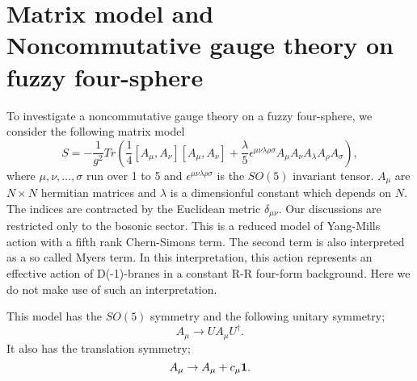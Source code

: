 \documentclass[a4paper,11pt]{article}
\begin{document}



\section{Matrix model and Noncommutative gauge theory on fuzzy four-sphere}
\label{section:NCGT}
\hspace{0.4cm}
To investigate a noncommutative gauge theory on a fuzzy four-sphere, 
we consider the following matrix model 
\begin{equation}
S=-\frac{1}{g^{2}}Tr\left(
\frac{1}{4}[A_{\mu},A_{\nu}][A_{\mu},A_{\nu}]
+\frac{\lambda}{5}\epsilon^{\mu\nu\lambda\rho\sigma}
A_{\mu}A_{\nu}A_{\lambda}A_{\rho}A_{\sigma}
\right),
\label{action}
\end{equation} 
where $\mu,\nu,\ldots,\sigma$ run over 1 to 5 and 
$\epsilon^{\mu\nu\lambda\rho\sigma}$ is the $SO(5)$ invariant tensor. 
$A_{\mu}$ are $N\times N$ hermitian matrices and 
$\lambda$ is a dimensionful constant which 
depends on $N$. 
The indices are contracted by the Euclidean metric $\delta_{\mu\nu}$. 
Our discussions are restricted only to the bosonic sector. 
This is a reduced model of Yang-Mills action with 
a fifth rank Chern-Simons term. 
The second term is also interpreted as a so called 
Myers term\cite{myers}. 
In this interpretation, this action represents 
an effective action of D(-1)-branes in a constant 
R-R four-form background. 
Here we do not make use of such an interpretation. 

This model has the $SO(5)$ symmetry and 
the following unitary symmetry; 
\begin{equation}
A_{\mu} \rightarrow UA_{\mu}U^{\dagger}. 
\label{unitarytr} 
\end{equation} 
It also has the translation symmetry; 
\begin{equation}
A_{\mu} \rightarrow A_{\mu} + c_{\mu}{\bf 1}.
\end{equation}
\end{document}
